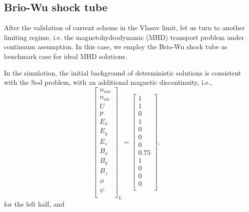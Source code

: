 \documentclass[preprint,3p,12pt,sort&compress]{elsarticle}
\begin{document}
\subsection{Brio-Wu shock tube} \label{sec:sod}

After the validation of current scheme in the Vlasov limit, let us turn to another limiting regime, i.e. the magnetohydrodynamic (MHD) transport problem under continuum assumption.
In this case, we employ the Brio-Wu shock tube \cite{brio1988upwind} as benchmark case for ideal MHD solutions.

In the simulation, the initial background of deterministic solutions is consistent with the Sod problem, with an additional magnetic discontinuity, i.e.,
\begin{equation*}
\left[\begin{array}{c}
n_{ion} \\
n_{ele} \\
U \\
p \\
E_x \\
E_y \\
E_z \\
B_x \\
B_y \\
B_z \\
\phi \\
\psi \\
\end{array}\right]_{{L}}=\left[\begin{array}{c}
1 \\
1  \\
0 \\
1 \\
0\\
0\\
0\\
0.75\\
1\\
0\\
0\\
0\\
\end{array}\right],
\end{equation*}
for the left half, and
\end{document}
